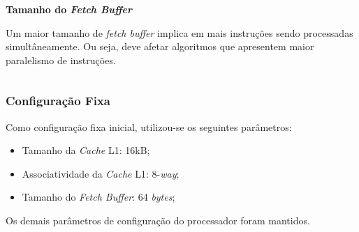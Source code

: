 \documentclass{beamer}
\begin{document}
\begin{frame}
\begin{columns}
\begin{column}{0.3\textwidth}
\begin{center}
                    \Large
                    \textbf{Tamanho do \textit{Fetch Buffer}}
                \end{center}

                \justifying
                \footnotesize
                Um maior tamanho de \textit{fetch buffer} implica em mais instruções sendo processadas simultâneamente. Ou seja,
                deve afetar algoritmos que apresentem maior paralelismo de instruções.

            \end{column}
        \end{columns}

    \end{frame}

    \begin{frame}
        \frametitle{Configuração Fixa}

        \LARGE
        Como configuração fixa inicial, utilizou-se os seguintes parâmetros:

        \begin{itemize}
            \item Tamanho da \textit{Cache} L1: 16kB;
            \item Associatividade da \textit{Cache} L1: 8-\textit{way};
            \item Tamanho do \textit{Fetch Buffer}: 64 \textit{bytes};
        \end{itemize}
        Os demais parâmetros de configuração do processador foram mantidos.

    \end{frame}
\end{document}
